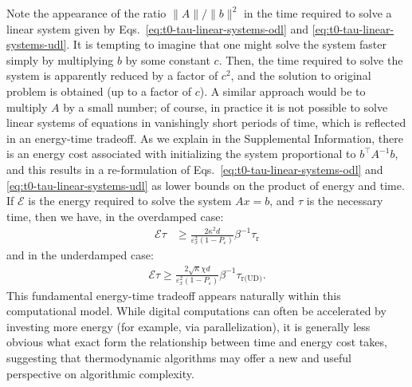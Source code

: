\documentclass[prx,onecolumn,floatfix,longbibliography,notitlepage, nofootinbib]{revtex4-1}
\renewcommand{\geq}{\geqslant}
\begin{document}
Note the appearance of the ratio $\|A\|/\|b\|^2$ in the time required to solve a linear system given by Eqs.~\eqref{eq:t0-tau-linear-systems-odl} and \eqref{eq:t0-tau-linear-systems-udl}. It is tempting to imagine that one might solve the system faster simply by multiplying $b$ by some constant $c$. Then, the time required to solve the system is apparently reduced by a factor of $c^2$, and the solution to original problem is obtained (up to a factor of $c$). A similar approach would be to multiply $A$ by a small number; of course, in practice it is not possible to solve linear systems of equations in vanishingly short periods of time, which is reflected in an energy-time tradeoff. As we explain in the Supplemental Information, there is an energy cost associated with initializing the system proportional to $b^\intercal A^{-1} b$, and this results in a re-formulation of Eqs.~\eqref{eq:t0-tau-linear-systems-odl} and \eqref{eq:t0-tau-linear-systems-udl} as lower bounds on the product of energy and time. If $\mathcal{E}$ is the energy required to solve the system $A x = b$, and $\tau$ is the necessary time, then we have, in the overdamped case:
\begin{align}
\label{eq:time-energy-odl}
    \mathcal{E}\tau &\geq \frac{2 \kappa^2 d  }{ \varepsilon_x^2 (1-P_\varepsilon)} \beta^{-1}\tau_\text{r}
\end{align}
and in the underdamped case:
\begin{align}
\label{time-energy-udl}
    \mathcal{E}\tau \geq  \frac{2\sqrt{\kappa} \chi  d}{  \varepsilon_x^2(1-P_\varepsilon)} \beta^{-1}\tau_{\text{r(UD)}}.
\end{align}
This fundamental energy-time tradeoff appears naturally within this computational model. While digital computations can often be accelerated by investing more energy (for example, via parallelization), it is generally less obvious what exact form the relationship between time and energy cost takes, suggesting that thermodynamic algorithms may offer a new and useful perspective on algorithmic complexity.
\end{document}
